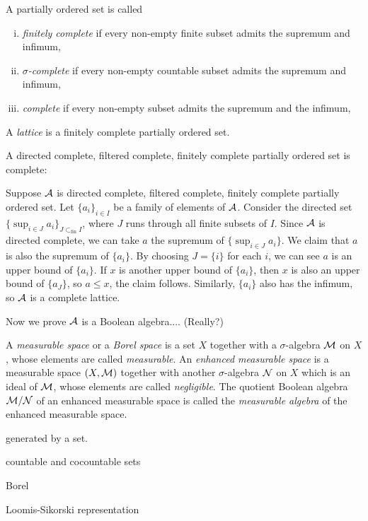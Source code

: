 \documentclass{../../large}
\begin{document}
\begin{prb}
A partially ordered set is called
\begin{enumerate}[(i)]
\item \emph{finitely complete} if every non-empty finite subset admits the supremum and infimum,
\item \emph{$\sigma$-complete} if every non-empty countable subset admits the supremum and infimum,
\item \emph{complete} if every non-empty subset admits the supremum and the infimum,
\end{enumerate}
A \emph{lattice} is a finitely complete partially ordered set.
\begin{parts}
\item 
\end{parts}
\end{prb}
\begin{pf}

A directed complete, filtered complete, finitely complete partially ordered set is complete:

Suppose $\mathcal{A}$ is directed complete, filtered complete, finitely complete partially ordered set. 
Let $\{a_i\}_{i\in I}$ be a family of elements of $\mathcal{A}$.
Consider the directed set $\{\sup_{i\in J}a_i\}_{J\subset_{\mathrm{fin}}I}$, where $J$ runs through all finite subsets of $I$.
Since $\mathcal{A}$ is directed complete, we can take $a$ the supremum of $\{\sup_{i\in J}a_i\}$.
We claim that $a$ is also the supremum of $\{a_i\}$.
By choosing $J=\{i\}$ for each $i$, we can see $a$ is an upper bound of $\{a_i\}$.
If $x$ is another upper bound of $\{a_i\}$, then $x$ is also an upper bound of $\{a_J\}$, so $a\le x$, the claim follows.
Similarly, $\{a_i\}$ also has the infimum, so $\mathcal{A}$ is a complete lattice.

Now we prove $\mathcal{A}$ is a Boolean algebra....
(Really?)
\end{pf}




\begin{prb}
A \emph{measurable space} or a \emph{Borel space} is a set $X$ together with a $\sigma$-algebra $\mathcal{M}$ on $X$, whose elements are called \emph{measurable}.
An \emph{enhanced measurable space} is a measurable space $(X,\mathcal{M})$ together with another $\sigma$-algebra $\mathcal{N}$ on $X$ which is an ideal of $\mathcal{M}$, whose elements are called \emph{negligible}.
The quotient Boolean algebra $\mathcal{M}/\mathcal{N}$ of an enhanced measurable space is called the \emph{measurable algebra} of the enhanced measurable space.
\begin{parts}
\item generated by a set.
\item countable and cocountable sets
\item Borel
\item Loomis-Sikorski representation
\end{parts}
\end{prb}
\begin{pf}

\end{pf}
\end{document}

